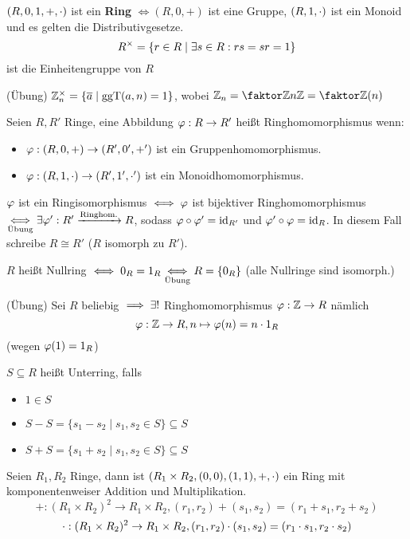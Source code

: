 \documentclass[a4paper]{report}
\begin{document}
\begin{whg*}
  $(R, 0, 1, +, \cd)$ ist ein \textbf{Ring} $\iff (R, 0, +)$ ist eine Gruppe, $(R, 1, \cd)$ ist ein Monoid und es gelten die Distributivgesetze.
  \[R^{\tm} = \{r \in R \mid \ex s \in R : rs = sr = 1\}\]
  ist die Einheitengruppe von $R$
\end{whg*}
\begin{bsp*}
(Übung) $\Zn\en = \{\bar a \mid \ggt(a, n) = 1\}$, wobei $\Zn = \fak \Z{n\Z} = \fak {\Z} {(n)}$
\end{bsp*}

\begin{defi}
  Seien $R, R'$ Ringe, eine Abbildung $\ph : R \to R'$ heißt Ringhomomorphismus wenn:
  \begin{itemize}
    \item $\ph : (R, 0, +) \to (R', 0', +')$ ist ein Gruppenhomomorphismus.
    \item $\ph : (R, 1, \cd) \to (R', 1', \cd')$ ist ein Monoidhomomorphismus.
  \end{itemize}
  $\ph$ ist ein Ringisomorphismus $\iff \ph$ ist bijektiver Ringhomomorphismus $\underset{\text{Übung}}\iff \ex \ph': R' \xrightarrow{\text{Ringhom.}} R$, sodass $\ph \circ \ph' = \id_{R'}$ und $\ph' \circ \ph = \id_{R}$. In diesem Fall schreibe $R \cong R'$ ($R$ isomorph zu $R'$).
\end{defi}
\begin{bsp*} $R$ heißt Nullring $\iff 0_{R} = 1_{R} \ueb\iff R = \{0_{R}\}$ (alle Nullringe sind isomorph.)
\end{bsp*}
\begin{bsp*}(Übung)
  Sei $R$ beliebig $\imp \ex!$ Ringhomomorphismus $\ph: \Z \to R$ nämlich
  \[\ph : \Z \to R, n \mapsto \ph(n) = n\cdot 1_{R}\]
  (wegen $\ph(1) = 1_{R}$)
\end{bsp*}

\begin{defi}
  $S \subseteq R$ heißt Unterring, falls
  \begin{itemize}
    \item $1 \in S$
    \item $S - S = \{s_{1}-s_{2} \mid s_{1}, s_{2} \in S\} \subseteq S$
    \item $S + S = \{s_{1}+s_{2} \mid s_{1}, s_{2} \in S\} \subseteq S$
  \end{itemize}
\end{defi}
\begin{defi*}
  Seien $R_{1}, R_{2}$ Ringe, dann ist $(R_{1} \tm R_{2}, (0,0), (1,1), +, \cd)$ ein Ring mit komponentenweiser Addition und Multiplikation.
  \[+ : (R_{1} \times R_{2})^{2} \to R_{1} \times R_{2}, (r_{1}, r_{2}) + (s_{1}, s_{2}) = (r_{1} + s_{1}, r_{2} + s_{2})\]
  \[\cd : (R_{1} \times R_{2})^{2} \to R_{1} \times R_{2}, (r_{1}, r_{2}) \cd (s_{1}, s_{2}) = (r_{1} \cd s_{1}, r_{2} \cd s_{2})\]
\end{defi*}
\end{document}
